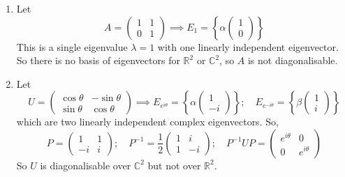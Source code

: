 \begin{enumerate}
	\item Let
	      \[
		      A = \begin{pmatrix}
			      1 & 1 \\ 0 & 1
		      \end{pmatrix} \implies E_1 = \left\{ \alpha\begin{pmatrix}
			      1 \\ 0
		      \end{pmatrix} \right\}
	      \]
	      This is a single eigenvalue \(\lambda = 1\) with one linearly independent eigenvector.
	      So there is no basis of eigenvectors for \(\mathbb R^2\) or \(\mathbb C^2\), so \(A\) is not diagonalisable.
	\item Let
	      \[
		      U = \begin{pmatrix}
			      \cos \theta & -\sin \theta \\
			      \sin \theta & \cos \theta
		      \end{pmatrix} \implies E_{e^{i\theta}} = \left\{ \alpha\begin{pmatrix}
			      1 \\ -i
		      \end{pmatrix} \right\};\quad E_{e^{-i\theta}} = \left\{ \beta\begin{pmatrix}
			      1 \\ i
		      \end{pmatrix} \right\}
	      \]
	      which are two linearly independent complex eigenvectors.
	      So,
	      \[
		      P = \begin{pmatrix}
			      1 & 1 \\ -i & i
		      \end{pmatrix};\quad P^{-1} = \frac{1}{2}\begin{pmatrix}
			      1 & i \\ 1 & -i
		      \end{pmatrix};\quad P^{-1}UP = \begin{pmatrix}
			      e^{i\theta} & 0 \\ 0 & e^{i\theta}
		      \end{pmatrix}
	      \]
	      So \(U\) is diagonalisable over \(\mathbb C^2\) but not over \(\mathbb R^2\).
\end{enumerate}


